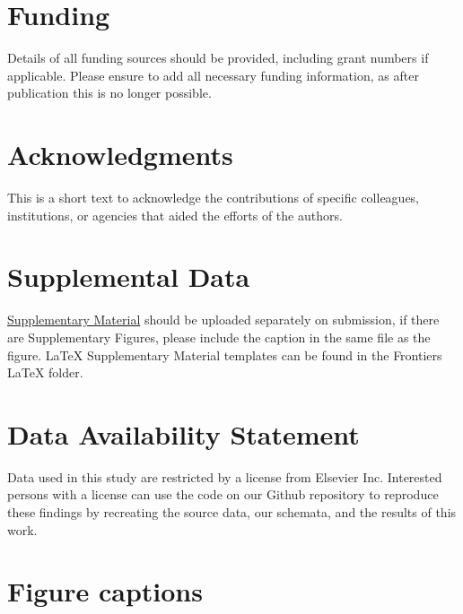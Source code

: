 \documentclass[utf8]{frontiersSCNS}
\begin{document}
\section*{Funding}
Details of all funding sources should be provided, including grant numbers if applicable. Please ensure to add all necessary funding information, as after publication this is no longer possible.

\section*{Acknowledgments}
This is a short text to acknowledge the contributions of specific colleagues, institutions, or agencies that aided the efforts of the authors.

\section*{Supplemental Data}
 \href{http://home.frontiersin.org/about/author-guidelines#SupplementaryMaterial}{Supplementary Material} should be uploaded separately on submission, if there are Supplementary Figures, please include the caption in the same file as the figure. LaTeX Supplementary Material templates can be found in the Frontiers LaTeX folder.

\section*{Data Availability Statement}
Data used in this study are restricted by a license from Elsevier Inc. Interested persons with a license can use the code on our Github repository to reproduce these findings by recreating the source data, our schemata, and the results of this work.

 


\section*{Figure captions}
\end{document}
